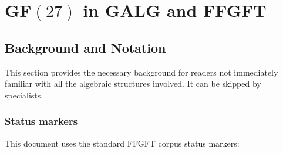 
\providecommand{\BM}{\textbf{[B]}}
\providecommand{\KM}{\textbf{[K]}}
\providecommand{\SM}{\textbf{[S]}}

\chapter*{GF$(27)$ in GALG and FFGFT}

\begin{abstract}
Doug Matzke reports in his IPI mail of 1~September~2026 that a systematic
search in GALG~G$(3)$ (6561 attempts) finds no element of order~26.
This document explains algebraically why, shows where such elements exist
in~G$(6)$, and draws the consequences for the FFGFT mass layer.

Three theorems:
\textbf{(A)}~G$(3) \cong M_2(\text{GF}(9))^2$: order~26 is algebraically
impossible in G$(3)$ --- not a search error, but a theorem.
\textbf{(B)}~G$(6) \cong M_8(\text{GF}(9))$: order-26 elements exist;
a 5-blade example can be verified directly in~GALG.
\textbf{(C)}~GF$(27)$ is present in G$(6)$ as an order structure, not as a subfield
(since $3 \nmid 8$) --- exactly the FFGFT statement from Doc.~338.

Consequence: $1/\alpha = 3700/27$ lives on the G$(3)$/GF$(9)$ level;
the lepton mass layer $(m_\mu/m_e)^2 = 43200$ needs G$(6)$ with
order-26 elements.
Verification script: \texttt{pruef\_341\_gf27\_in\_galg.py} (all assertions~\BM).
\end{abstract}

\section{Background and Notation}

This section provides the necessary background for readers not
immediately familiar with all the algebraic structures involved.
It can be skipped by specialists.

\subsection*{Status markers}

This document uses the standard FFGFT corpus status markers:


